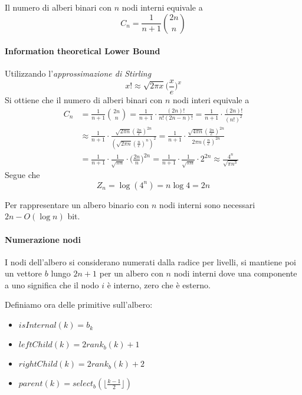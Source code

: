 \begin{theorem}
    Il numero di alberi binari con $n$ nodi interni equivale a
    $$C_n = \frac{1}{n+1}\binom{2n}{n}$$
\end{theorem}
\paragraph{Information theoretical Lower Bound}
Utilizzando l'\emph{approssimazione di Stirling}
$$x! \approx \sqrt{2\pi x}\bigg(\frac{x}{e}\bigg)^x $$
Si ottiene che il numero di alberi binari con $n$ nodi interi equivale a 
\begin{equation}
    \begin{aligned}
        C_n &= \frac{1}{n+1}\binom{2n}{n} = \frac{1}{n+1}\cdot\frac{(2n)!}{n!(2n-n)!} 
        = \frac{1}{n+1}\cdot\frac{(2n)!}{(n!)^2} \\
        &\approx \frac{1}{n+1}\cdot
        \frac{\sqrt{2\pi n}(\frac{2n}{e})^{2n}}{(\sqrt{2\pi n}(\frac{n}{e})^n)^2}
        = \frac{1}{n+1}\cdot \frac{\sqrt{4\pi n}(\frac{2n}{e})^{2n}}{2\pi n (\frac{n}{e})^{2n}}\\
        &= \frac{1}{n+1} \cdot \frac{1}{\sqrt{\pi n}}\cdot \bigg(\frac{2n}{n}\bigg)^{2n}
        = \frac{1}{n+1}\cdot \frac{1}{\sqrt{\pi n}}\cdot 2^{2n} \approx \frac{4^n}{\sqrt{\pi n^3}}
    \end{aligned}
\end{equation}
Segue che $$Z_n = \log(4^n) = n\log 4 = 2n$$

\begin{theorem}
    Per rappresentare un albero binario con $n$ nodi interni sono necessari
    $2n - O(\log n)$ bit.
\end{theorem}

\paragraph{Numerazione nodi}
I nodi dell'albero si considerano numerati dalla radice per livelli, 
si mantiene poi un vettore $b$ lungo $2n +1$ per un albero con $n$ nodi interni
dove una componente a uno significa che il nodo $i$ è interno, zero che è esterno.

Definiamo ora delle primitive sull'albero:
\begin{itemize}
    \item $\mathit{isInternal(k)} = b_k$
    \item $\mathit{leftChild(k)} = 2\mathit{rank}_b(k) +1$
    \item $\mathit{rightChild(k)} = 2\mathit{rank}_b(k) +2$
    \item $\mathit{parent(k)} = \mathit{select}_b(\lfloor \frac{k-1}{2} \rfloor)$
\end{itemize}

